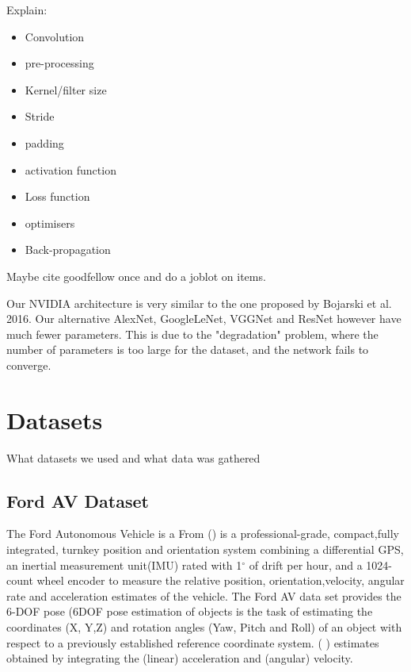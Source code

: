 Explain:  
\begin{itemize}
    \item Convolution
    \item pre-processing
    \item Kernel/filter size
    \item Stride
    \item padding
    \item activation function
    \item Loss function
    \item optimisers
    \item Back-propagation
\end{itemize}

Maybe cite goodfellow once and do a joblot on items.  

Our NVIDIA architecture is very similar to the one proposed by Bojarski et al. 2016. Our alternative AlexNet, GoogleLeNet, VGGNet and ResNet however have much fewer parameters. This is due to the "degradation" problem, where the number of parameters is too large for the dataset, and the network fails to converge.

\section{Datasets}
What datasets we used and what data was gathered

\subsection{Ford AV Dataset}
The Ford Autonomous Vehicle is a 
From %
 (\cite{Applanix}) is a professional-grade, compact,fully  integrated,  turnkey  position  and  orientation  system combining a differential GPS, an inertial measurement unit(IMU)  rated  with  1$^{\circ}$ of  drift  per  hour,  and  a  1024-count wheel encoder to measure the relative position, orientation,velocity,  angular  rate  and  acceleration  estimates  of  the vehicle. The Ford AV data set provides the 6-DOF pose (6DOF pose estimation of objects is the task of estimating the coordinates (X, Y,Z) and rotation angles (Yaw, Pitch and Roll) of an object with respect to a previously established reference coordinate system. (\cite{7005077} ) estimates obtained by integrating the (linear) acceleration and (angular) velocity.

